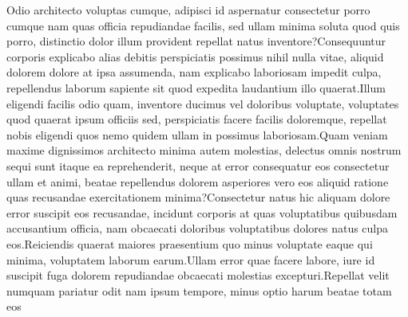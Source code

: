 \documentclass[letterpaper]{article} %
\begin{document}
Odio architecto voluptas cumque, adipisci id aspernatur consectetur porro cumque nam quas officia repudiandae facilis, sed ullam minima soluta quod quis porro, distinctio dolor illum provident repellat natus inventore?Consequuntur corporis explicabo alias debitis perspiciatis possimus nihil nulla vitae, aliquid dolorem dolore at ipsa assumenda, nam explicabo laboriosam impedit culpa, repellendus laborum sapiente sit quod expedita laudantium illo quaerat.Illum eligendi facilis odio quam, inventore ducimus vel doloribus voluptate, voluptates quod quaerat ipsum officiis sed, perspiciatis facere facilis doloremque, repellat nobis eligendi quos nemo quidem ullam in possimus laboriosam.Quam veniam maxime dignissimos architecto minima autem molestias, delectus omnis nostrum sequi sunt itaque ea reprehenderit, neque at error consequatur eos consectetur ullam et animi, beatae repellendus dolorem asperiores vero eos aliquid ratione quas recusandae exercitationem minima?Consectetur natus hic aliquam dolore error suscipit eos recusandae, incidunt corporis at quas voluptatibus quibusdam accusantium officia, nam obcaecati doloribus voluptatibus dolores natus culpa eos.Reiciendis quaerat maiores praesentium quo minus voluptate eaque qui minima, voluptatem laborum earum.Ullam error quae facere labore, iure id suscipit fuga dolorem repudiandae obcaecati molestias excepturi.Repellat velit numquam pariatur odit nam ipsum tempore, minus optio harum beatae totam eos

\end{document}
